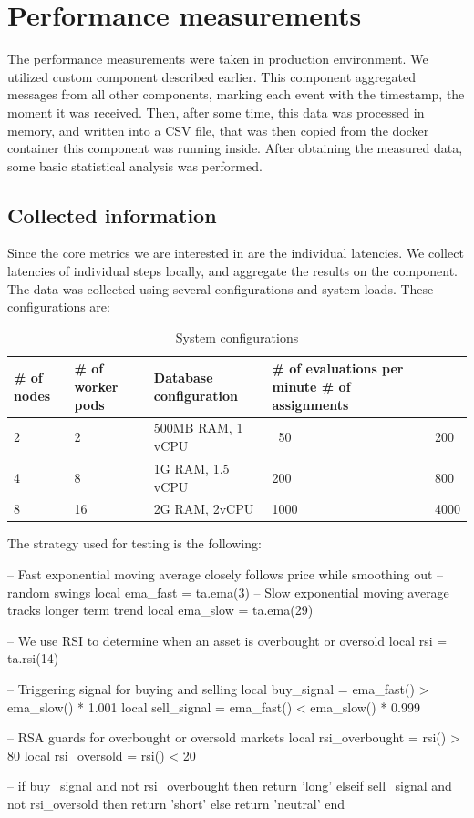 \section{Performance measurements}
The performance measurements were taken in production environment. We utilized custom component described earlier. This component aggregated
messages from all other components, marking each event with the timestamp, the moment it was received. Then, after some time, this
data was processed in memory, and written into a CSV file, that was then copied from the docker container this component was
running inside. After obtaining the measured data, some basic statistical analysis was performed.

\subsection{Collected information}
Since the core metrics we are interested in are the individual latencies. We collect latencies of individual steps locally, and
aggregate the results on the  component. The data was collected using several configurations and system loads.
These configurations are:

\begin{table}[H]
    \begin{tabular}{|l|l|l|l|l|}
        \hline
        \# of nodes & \# of worker pods & Database configuration & \# of evaluations per minute \# of assignments \\ \hline

        2 & 2 & 500MB RAM, 1 vCPU & ~50 & 200 \\ \hline
        4 & 8 & 1G RAM, 1.5 vCPU & 200 & 800 \\ \hline
        8 & 16 & 2G RAM, 2vCPU & 1000 & 4000 \\ \hline
    \end{tabular}
    \caption{System configurations}
\end{table}
\newpage
The strategy used for testing is the following:


\begin{code}[language={[5.2]Lua},label={test_strategy},caption={Example strategy}]
-- Fast exponential moving average closely follows price while smoothing out
-- random swings
local ema_fast = ta.ema(3)
-- Slow exponential moving average tracks longer term trend
local ema_slow = ta.ema(29)

-- We use RSI to determine when an asset is overbought or oversold
local rsi = ta.rsi(14)

-- Triggering signal for buying and selling
local buy_signal = ema_fast() > ema_slow() * 1.001
local sell_signal = ema_fast() < ema_slow() * 0.999

-- RSA guards for overbought or oversold markets
local rsi_overbought = rsi() > 80
local rsi_oversold = rsi() < 20

--
if buy_signal and not rsi_overbought then
    return 'long'
elseif sell_signal and not rsi_oversold then
    return 'short'
else
    return 'neutral'
end
\end{code}
